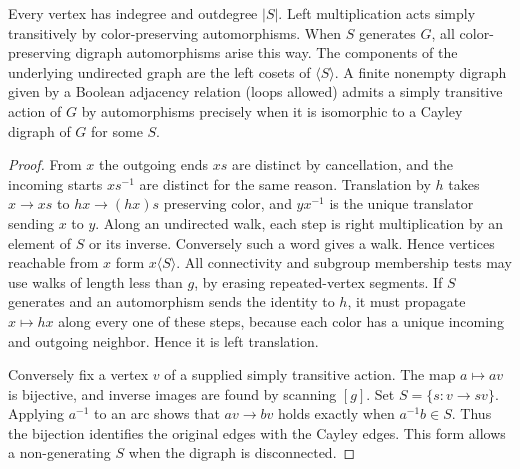 \begin{theorem}\label{result24}
Every vertex has indegree and outdegree $|S|$. Left multiplication acts simply transitively by color-preserving automorphisms. When $S$ generates $G$, all color-preserving digraph automorphisms arise this way. The components of the underlying undirected graph are the left cosets of $\langle S\rangle$. A finite nonempty digraph given by a Boolean adjacency relation (loops allowed) admits a simply transitive action of $G$ by automorphisms precisely when it is isomorphic to a Cayley digraph of $G$ for some $S$.
\end{theorem}
\begin{proof}
From $x$ the outgoing ends $xs$ are distinct by cancellation, and the incoming starts $xs^{-1}$ are distinct for the same reason. Translation by $h$ takes $x\to xs$ to $hx\to(hx)s$ preserving color, and $yx^{-1}$ is the unique translator sending $x$ to $y$. Along an undirected walk, each step is right multiplication by an element of $S$ or its inverse. Conversely such a word gives a walk. Hence vertices reachable from $x$ form $x\langle S\rangle$. All connectivity and subgroup membership tests may use walks of length less than $g$, by erasing repeated-vertex segments. If $S$ generates and an automorphism sends the identity to $h$, it must propagate $x\mapsto hx$ along every one of these steps, because each color has a unique incoming and outgoing neighbor. Hence it is left translation.

Conversely fix a vertex $v$ of a supplied simply transitive action. The map $a\mapsto av$ is bijective, and inverse images are found by scanning $[g]$. Set $S=\{s:v\to sv\}$. Applying $a^{-1}$ to an arc shows that $av\to bv$ holds exactly when $a^{-1}b\in S$. Thus the bijection identifies the original edges with the Cayley edges. This form allows a non-generating $S$ when the digraph is disconnected.
\end{proof}

